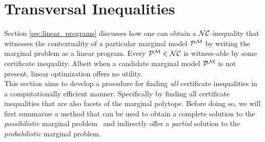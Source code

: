 \documentclass[aps, 10pt, english, twoside, pra, nofootinbib, longbibliography]{revtex4-1}
\theoremstyle{plain}
\theoremstyle{definition}
\theoremstyle{remark}
\newcommand{\mscenario}{\mathcal{M}}
\begin{document}


    \section{Transversal Inequalities}

    Section \ref{sec:linear_programs} discusses how one can obtain a $\mathcal{NC}$-inequality that witnesses the contextuality of a particular marginal model $\probvec^{\mscenario}$ by writing the marginal problem as a linear program. Every $\probvec^{\mscenario} \in \s{NC}$ is witness-able by some certificate inequality. Albeit when a candidate marginal model $\probvec^{\mscenario}$ is not present, linear optimization offers no utility. \\

    This section aims to develop a procedure for finding \textit{all} certificate inequalities in a computationally efficient manner. Specifically by finding all certificate inequalities that are also facets of the marginal polytope. Before doing so, we will first summarize a method  that can be used to obtain a complete solution to the \textit{possibilistic} marginal problem~\cite{Mansfield_2012} and indirectly offer a \textit{partial} solution to the \textit{probabilistic} marginal problem.
\end{document}
